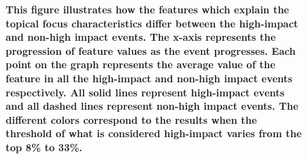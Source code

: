 \documentclass[10pt,letterpaper]{article}
\begin{document}
\begin{figure}[h]
  \caption{\textbf{This figure illustrates how the features which
      explain the topical focus characteristics differ between the
      high-impact and non-high impact events. The x-axis represents
      the progression of feature values as the event progresses. Each
      point on the graph represents the average value of the feature
      in all the high-impact and non-high impact events respectively.
      All solid lines represent high-impact events and all dashed
      lines represent non-high impact events. The different colors
      correspond to the results when the threshold of what is
      considered high-impact varies from the top 8\% to 33\%. }}
  \label{fig:topical_focus_hypothesis}
\end{figure}

\end{document}
